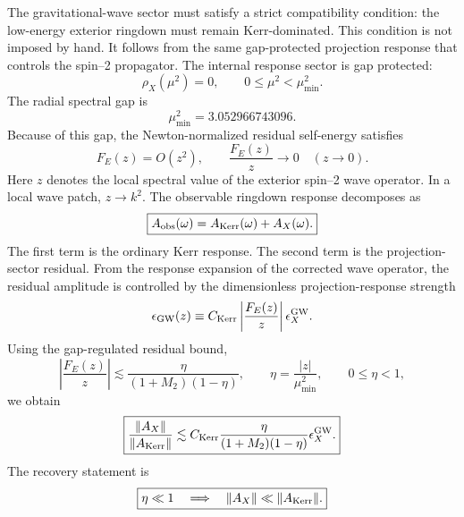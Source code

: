 \documentclass[11pt]{article}
\begin{document}
The gravitational-wave sector must satisfy a strict compatibility condition:
the low-energy exterior ringdown must remain Kerr-dominated. This condition is
not imposed by hand. It follows from the same gap-protected projection response
that controls the spin--2 propagator. The internal response sector is gap protected:
\begin{equation}
\boxed{
\rho_X(\mu^2)=0,
\qquad
0\leq\mu^2<\mu_{\min}^2.
}
\end{equation}
The radial spectral gap is
\begin{equation}
\boxed{
\mu_{\min}^2
=
3.052966743096.
}
\end{equation}
Because of this gap, the Newton-normalized residual self-energy satisfies
\begin{equation}
\boxed{
F_E(z)=O(z^2),
\qquad
\frac{F_E(z)}{z}\rightarrow0
\quad
(z\rightarrow0).
}
\end{equation}
Here \(z\) denotes the local spectral value of the exterior spin--2 wave
operator. In a local wave patch, \(z\rightarrow k^2\). The observable ringdown response decomposes as
\begin{equation}
\boxed{
A_{\rm obs}(\omega)
=
A_{\rm Kerr}(\omega)
+
A_X(\omega).
}
\end{equation}
The first term is the ordinary Kerr response. The second term is the
projection-sector residual. From the response expansion of the corrected
wave operator, the residual amplitude is controlled by the dimensionless
projection-response strength
\begin{equation}
\epsilon_{\rm GW}(z)
\equiv
C_{\rm Kerr}
\left|
\frac{F_E(z)}{z}
\right|
\epsilon_X^{\rm GW}.
\end{equation}
Using the gap-regulated residual bound,
\begin{equation}
\left|
\frac{F_E(z)}{z}
\right|
\lesssim
\frac{\eta}{(1+M_2)(1-\eta)},
\qquad
\eta=\frac{|z|}{\mu_{\min}^2},
\qquad
0\leq\eta<1,
\end{equation}
we obtain
\begin{equation}
\boxed{
\frac{\|A_X\|}{\|A_{\rm Kerr}\|}
\lesssim
C_{\rm Kerr}
\frac{\eta}{(1+M_2)(1-\eta)}
\epsilon_X^{\rm GW}.
}
\end{equation}
The recovery statement is
\begin{equation}
\boxed{
\eta\ll1
\quad
\Longrightarrow
\quad
\|A_X\|\ll\|A_{\rm Kerr}\|.
}
\end{equation}
\end{document}
